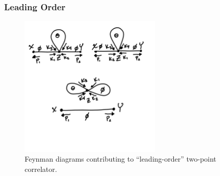 \documentclass{article}
\numberwithin{equation}{subsection}
\begin{document}
\subsubsection{Leading Order}

\begin{figure}[t]
	\centering
	\includegraphics[width=0.6\textwidth,trim={0 2cm 0 0},clip]{feynDias.png}
	\caption{Feynman diagrams contributing to ``leading-order'' two-point correlator.}
	\label{fig:twoPtFeyn}
\end{figure}
\end{document}
